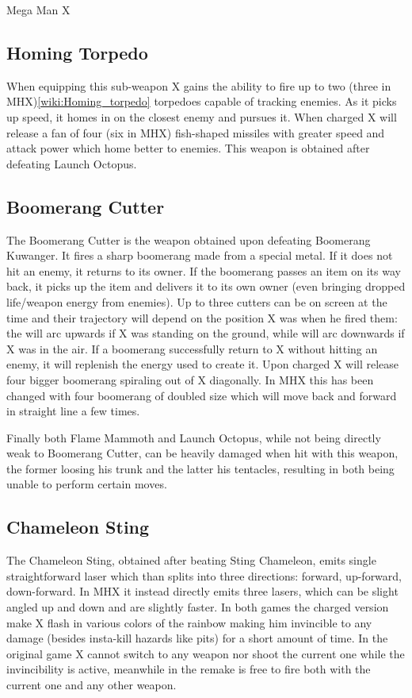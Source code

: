 \documentclass[openany]{report}
\begin{document}
\begin{chapter}{Mega Man X}
	\subsection{Homing Torpedo}
	When equipping this sub-weapon X gains the ability to fire up to two (three in MHX)\ref{wiki:Homing_torpedo} torpedoes capable of tracking enemies. As it picks up speed, it homes in on the closest enemy and pursues it. When charged X will release a fan of four (six in MHX) fish-shaped missiles with greater speed and attack power which home better to enemies. This weapon is obtained after defeating Launch Octopus.
	\subsection{Boomerang Cutter}
	The Boomerang Cutter is the weapon obtained upon defeating Boomerang Kuwanger. It fires a sharp boomerang made from a special metal. If it does not hit an enemy, it returns to its owner. If the boomerang passes an item on its way back, it picks up the	item and delivers it to its own owner (even bringing dropped life/weapon energy from enemies). Up to three cutters can be on screen at the time\cite{wiki:Boomerang_cutter} and their trajectory will depend on the position X was when he fired them: the will arc upwards if X was standing on the ground, while will arc downwards if X was in the air. If a boomerang successfully return to X without hitting an enemy, it will replenish the energy used to create it. Upon charged X will release four bigger boomerang spiraling out of X diagonally. In MHX this has been changed with four boomerang of doubled size which will move back and forward in straight line a few times. 
	
	Finally both Flame Mammoth and Launch Octopus, while not being directly weak to Boomerang Cutter, can be heavily damaged when hit with this weapon, the former loosing his trunk and the latter his tentacles, resulting in both being unable to perform certain moves.
	\subsection{Chameleon Sting}
	The Chameleon Sting, obtained after beating Sting Chameleon, emits single straightforward laser which than splits into three directions: forward, up-forward, down-forward. In MHX it instead directly emits three lasers, which can be slight angled up and down and are slightly faster. In both games the charged version make X flash in various colors of the rainbow making him invincible to any damage (besides insta-kill hazards like pits) for a short amount of time. In the original game X cannot switch to any weapon nor shoot the current one while the invincibility is active, meanwhile in the remake is free to fire both with the current one and any other weapon\cite{wiki:Chameleon_sting}.

\end{chapter}
\end{document}
